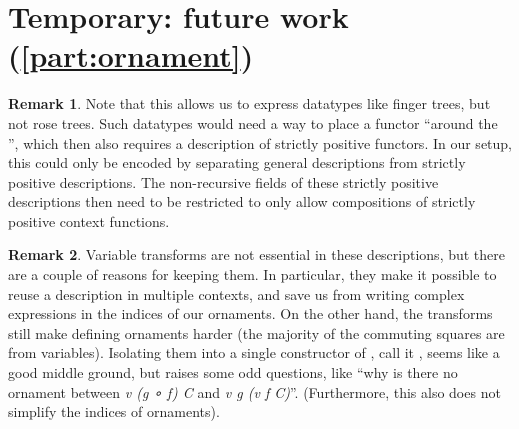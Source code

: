 \documentclass[10pt]{article}
\theoremstyle{plain}
\theoremstyle{definition}
\newtheorem{remark}{Remark}[section]
\renewcommand{\AgdaBoundFontStyle}[1]{\textit{\AgdaSerifFont{}#1}}
\newcommand{\investigate}[1]{\par\vspace{1\baselineskip}\textcolor{gray}{#1}\vspace{1\baselineskip}\par}
\begin{document}
\section{Temporary: future work (\autoref{part:ornament})}
\begin{remark}
    Note that this allows us to express datatypes like finger trees, but not rose trees. Such datatypes would need a way to place a functor ``around the '', which then also requires a description of strictly positive functors. In our setup, this could only be encoded by separating general descriptions from strictly positive descriptions. The non-recursive fields of these strictly positive descriptions then need to be restricted to only allow compositions of strictly positive context functions. 
\end{remark} %

\begin{remark}
    Variable transforms are not essential in these descriptions, but there are a couple of reasons for keeping them. In particular, they make it possible to reuse a description in multiple contexts, and save us from writing complex expressions in the indices of our ornaments. On the other hand, the transforms still make defining ornaments harder (the majority of the commuting squares are from variables). Isolating them into a single constructor of , call it , seems like a good middle ground, but raises some odd questions, like ``why is there no ornament between \AgdaBoundFontStyle{v (g ∘ f) C} and \AgdaBoundFontStyle{v g (v f C)}''. (Furthermore, this also does not simplify the indices of ornaments).
\end{remark} %
\end{document}
